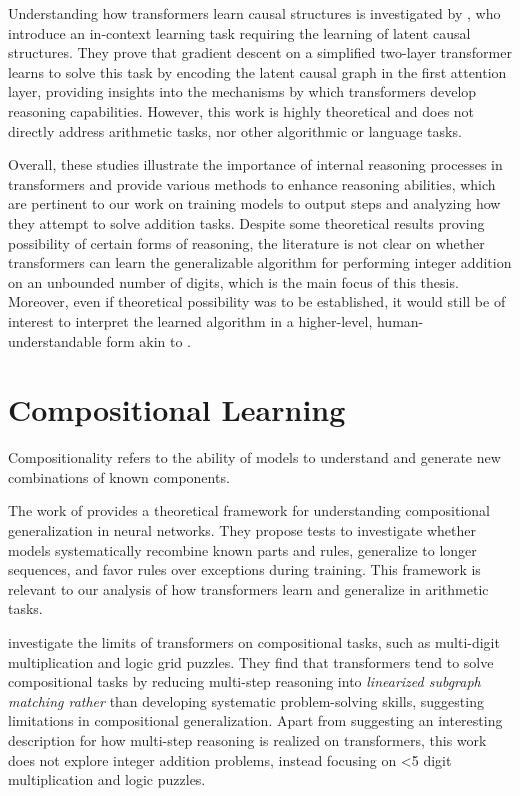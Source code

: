 Understanding how transformers learn causal structures is investigated by \cite{nichani_how_2024}, who introduce an in-context learning task requiring the learning of latent causal structures. They prove that gradient descent on a simplified two-layer transformer learns to solve this task by encoding the latent causal graph in the first attention layer, providing insights into the mechanisms by which transformers develop reasoning capabilities. However, this work is highly theoretical and does not directly address arithmetic tasks, nor other algorithmic or language tasks.

Overall, these studies illustrate the importance of internal reasoning processes in transformers and provide various methods to enhance reasoning abilities, which are pertinent to our work on training models to output steps and analyzing how they attempt to solve addition tasks. Despite some theoretical results proving possibility of certain forms of reasoning, the literature is not clear on whether transformers can learn the generalizable algorithm for performing integer addition on an unbounded number of digits, which is the main focus of this thesis. Moreover, even if theoretical possibility was to be established, it would still be of interest to interpret the learned algorithm in a higher-level, human-understandable form akin to \cite{nanda_fourier}.

\section{Compositional Learning}\label{sec:sota_compositional_learning}

Compositionality refers to the ability of models to understand and generate new combinations of known components.

The work of \cite{hupkes_compositionality_2020} provides a theoretical framework for understanding compositional generalization in neural networks. They propose tests to investigate whether models systematically recombine known parts and rules, generalize to longer sequences, and favor rules over exceptions during training. This framework is relevant to our analysis of how transformers learn and generalize in arithmetic tasks.

\cite{dziri_faith_2023} investigate the limits of transformers on compositional tasks, such as multi-digit multiplication and logic grid puzzles. They find that transformers tend to solve compositional tasks by reducing multi-step reasoning into \emph{linearized subgraph matching rather} than developing systematic problem-solving skills, suggesting limitations in compositional generalization. Apart from suggesting an interesting description for how multi-step reasoning is realized on transformers, this work does not explore integer addition problems, instead focusing on <5 digit multiplication and logic puzzles.


